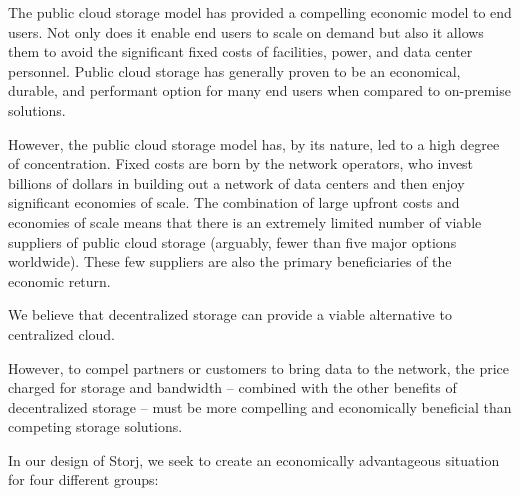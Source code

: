 \documentclass[11pt,fleqn,openany]{book}
\begin{document}
The public cloud storage model has provided a compelling economic model to end
users. Not only does it enable end users to scale on demand but also it allows them to avoid the significant fixed costs of facilities, power, and data center
personnel. Public cloud storage has generally proven to be an economical,
durable, and performant option for many end users when compared to
on-premise solutions.

However, the public cloud storage model has, by its nature, led to a high
degree of concentration. Fixed costs are born by the network operators, who
invest billions of dollars in building out a network of data centers and
then enjoy significant economies of scale. The combination of large upfront
costs and economies of scale means that there is an extremely limited number
of viable suppliers of public cloud storage (arguably, fewer than five major
options worldwide). These few suppliers are also the primary beneficiaries of
the economic return.

We believe that decentralized storage can provide a viable alternative to
centralized cloud.

However, to compel partners or customers to bring data to the network,
the price charged for storage and bandwidth -- combined with the other
benefits of decentralized storage -- must be
more compelling and economically beneficial than competing storage solutions.

In our design of Storj, we seek to create an economically advantageous
situation for four different groups:
\end{document}
